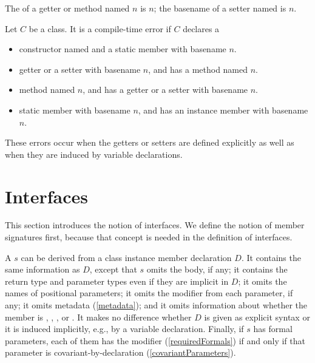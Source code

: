 \documentclass[makeidx]{article}
\begin{document}
\LMHash{}%
The  of a getter or method named $n$ is $n$;
the basename of a setter named  is $n$.

\LMHash{}%
Let $C$ be a class.
It is a compile-time error if $C$ declares a
\begin{itemize}
\item constructor named  and a static member with basename $n$.
\item getter or a setter with basename $n$, and has a method named $n$.
\item method named $n$, and has a getter or a setter with basename $n$.
\item static member with basename $n$, and has an instance member with basename $n$.
\end{itemize}
These errors occur when the getters or setters are defined explicitly
as well as when they are induced by variable declarations.


\section{Interfaces}

\LMHash{}%
This section introduces the notion of interfaces.
We define the notion of member signatures first,
because that concept is needed in the definition of interfaces.


\LMHash{}%
A  $s$
can be derived from a class instance member declaration $D$.
It contains the same information as $D$,
except that $s$ omits the body, if any;
it contains the return type and parameter types
even if they are implicit in $D$;
it omits the names of positional parameters;
it omits the modifier \FINAL{} from each parameter, if any;
it omits metadata
(\ref{metadata});
and it omits information about whether the member is
\EXTERNAL{}, \ASYNC{}, \ASYNC*, or \SYNC*.
It makes no difference whether $D$ is given as explicit syntax
or it is induced implicitly, e.g., by a variable declaration.
Finally, if $s$ has formal parameters,
each of them has the modifier \COVARIANT{}
(\ref{requiredFormals})
if and only if that parameter is covariant-by-declaration
(\ref{covariantParameters}).
\end{document}
